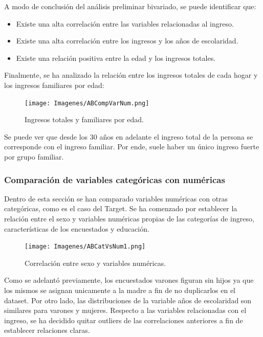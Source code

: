 \documentclass[a4paper]{article}
\begin{document}
        A modo de conclusión del análisis preliminar bivariado, se puede identificar que:
        \begin{itemize}
            \item Existe una alta correlación entre las variables relacionadas al ingreso.
            \item Existe una alta correlación entre los ingresos y los años de escolaridad.
            \item Existe una relación positiva entre la edad y los ingresos totales.
        \end{itemize}
 
            Finalmente, se ha analizado la relación entre los ingresos totales de cada hogar y los ingresos familiares por edad:
            \begin{figure}[H]
                \centering
                \texttt{[image: Imagenes/ABCompVarNum.png]}
                \caption{Ingresos totales y familiares por edad.}
                \label{AB Income and age relationship}
            \end{figure}
 
            Se puede ver que desde los 30 años en adelante el ingreso total de la persona se corresponde con el ingreso familiar. Por ende, suele haber un único ingreso fuerte por grupo familiar.
 
        \subsubsection{Comparación de variables categóricas con numéricas}
 
            Dentro de esta sección se han comparado variables numéricas con otras categóricas, como es el caso del Target. Se ha comenzado por establecer la relación entre el sexo y variables numéricas propias de las categorías de ingreso, características de los encuestados y educación.
 
            \begin{figure}[H]
                \centering
                \texttt{[image: Imagenes/ABCatVsNum1.png]}
                \caption{Correlación entre sexo y variables numéricas.}
                \label{AB genre and numeric variables}
            \end{figure}
 
            Como se adelantó previamente, los encuestados varones figuran sin hijos ya que los mismos se asignan unicamente a la madre a fin de no duplicarlos en el dataset. Por otro lado, las distribuciones de la variable años de escolaridad son similares para varones y mujeres.
            Respecto a las variables relacionadas con el ingreso, se ha decidido quitar outliers de las correlaciones anteriores a fin de establecer relaciones claras.
 
\end{document}
